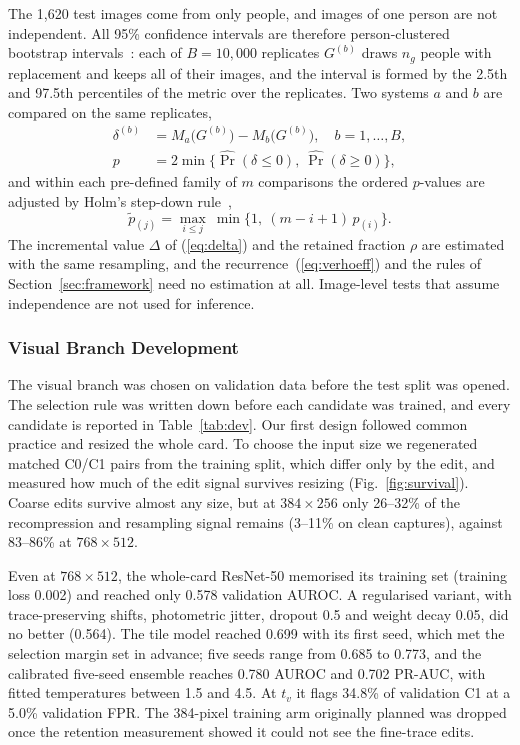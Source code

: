 \documentclass[12pt]{article}
\begin{document}
The 1{,}620 test images come from only \dsTestPer{} people, and images
of one person are not independent. All 95\% confidence intervals are
therefore person-clustered bootstrap intervals~\cite{efron}: each of
$B=10{,}000$ replicates $G^{(b)}$ draws $n_g$ people with replacement
and keeps all of their images, and the interval is formed by the 2.5th
and 97.5th percentiles of the metric over the replicates. Two systems
$a$ and $b$ are compared on the same replicates,
\begin{equation}
\label{eq:paired}
\begin{aligned}
\delta^{(b)}&=M_a\big(G^{(b)}\big)-M_b\big(G^{(b)}\big),\quad b=1,\dots,B,\\
p&=2\min\big\{\widehat{\Pr}(\delta\le0),\ \widehat{\Pr}(\delta\ge0)\big\},
\end{aligned}
\end{equation}
and within each pre-defined family of $m$ comparisons the ordered
$p$-values are adjusted by Holm's step-down rule~\cite{holm},
\begin{equation}
\label{eq:holm}
\tilde{p}_{(j)}=\max_{i\le j}\ \min\big\{1,\ (m-i+1)\,p_{(i)}\big\}.
\end{equation}
The incremental value $\Delta$ of (\ref{eq:delta}) and the retained
fraction $\rho$ are estimated with the same resampling, and the
recurrence~(\ref{eq:verhoeff}) and the rules of
Section~\ref{sec:framework} need no estimation at all. Image-level tests
that assume independence are not used for inference.

\subsubsection{Visual Branch Development}
\label{sec:dev}

The visual branch was chosen on validation data before the test split
was opened. The selection rule was written down before each candidate
was trained, and every candidate is reported in
Table~\ref{tab:dev}. Our first design followed common practice and
resized the whole card. To choose the input size we regenerated matched
C0/C1 pairs from the training split, which differ only by the edit, and
measured how much of the edit signal survives resizing
(Fig.~\ref{fig:survival}). Coarse edits survive almost any size, but at
$384{\times}256$ only 26--32\% of the recompression and resampling
signal remains (3--11\% on clean captures), against 83--86\% at
$768{\times}512$.



Even at $768{\times}512$, the whole-card ResNet-50 memorised its
training set (training loss 0.002) and reached only 0.578 validation
AUROC. A regularised variant, with trace-preserving shifts, photometric
jitter, dropout 0.5 and weight decay 0.05, did no better (0.564). The
tile model reached 0.699 with its first seed, which met the selection
margin set in advance; five seeds range from 0.685 to 0.773, and the
calibrated five-seed ensemble reaches 0.780 AUROC and 0.702 PR-AUC, with
fitted temperatures between 1.5 and 4.5. At $t_v$ it flags 34.8\% of
validation C1 at a 5.0\% validation FPR. The 384-pixel training arm
originally planned was dropped once the retention measurement showed it
could not see the fine-trace edits.
\end{document}
